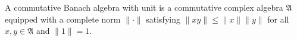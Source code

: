 
A commutative Banach algebra with unit is a commutative complex algebra $\mathfrak{A}$ equipped with a complete norm $\|\cdot\|$ satisfying $\|xy\| \leq \|x\|\|y\|$ for all $x, y \in \mathfrak{A}$ and $\|1\| = 1$.
